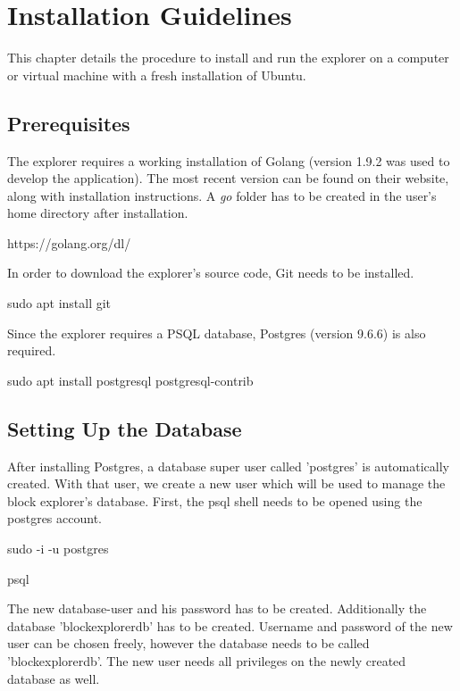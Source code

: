 \appendix

\chapter{Installation Guidelines}
This chapter details the procedure to install and run the explorer on a computer or virtual machine with a fresh installation of Ubuntu.
\section{Prerequisites}
The explorer requires a working installation of Golang (version 1.9.2 was used to develop the application). The most recent version can be found on their website, along with installation instructions. A \emph{go} folder has to be created in the user's home directory after installation.

\begin{framed}
https://golang.org/dl/
\end{framed}

In order to download the explorer's source code, Git needs to be installed. 

\begin{framed}
sudo apt install git
\end{framed}

Since the explorer requires a PSQL database, Postgres (version 9.6.6) is also required.

\begin{framed}
sudo apt install postgresql postgresql-contrib
\end{framed}

\section{Setting Up the Database}

After installing Postgres, a database super user called 'postgres' is automatically created. With that user, we create a new user which will be used to manage the block explorer's database. First, the psql shell needs to be opened using the postgres account.

\begin{framed}
sudo -i -u postgres

psql
\end{framed}
The new database-user and his password has to be created. Additionally the database 'blockexplorerdb' has to be created. Username and password of the new user can be chosen freely, however the database needs to be called 'blockexplorerdb'. The new user needs all privileges on the newly created database as well.

